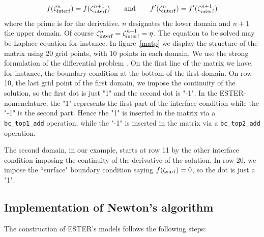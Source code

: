 \[ f(\zeta_{\rm interf}^n) = f(\zeta_{\rm interf}^{n+1}) \qquad {\rm and}\qquad f'(\zeta_{\rm
interf}^n) = f'(\zeta_{\rm interf}^{n+1})\]
where the prime is for the derivative. $n$ designates the lower domain
and $n+1$ the upper domain. Of course $\zeta_{\rm interf}^n=\zeta_{\rm
interf}^{n+1}=\eta$. The equation to be solved may be Laplace
equation for instance. In figure~\ref{matp} we display the structure of the
matrix using 20 grid points, with 10 points in each domain. We use the
strong formulation of the differential problem \cite[][]{RELP16}. On the
first line of the matrix we have, for instance, the boundary condition
at the bottom of the first domain. On row 10, the last grid point of the
first domain, we impose the continuity of the solution, so the first dot
is just "1" and the second dot is "-1". In the ESTER-nomenclature, the
"1" represents the first part of the interface condition while the "-1"
is the second part. Hence the "1" is inserted in the matrix via a {\tt
bc\_top1\_add} operation, while the "-1" is inserted in the matrix via a
{\tt bc\_top2\_add}  operation.

The second domain, in our example, starts at row 11 by the other
interface condition imposing the continuity of the derivative of the
solution. In row 20, we impose the ``surface" boundary condition saying
$f(\zeta_{\rm surf})=0$, so the dot is just a "1".


\subsection{Implementation of Newton's algorithm}

The construction of ESTER's models follows the following steps:


